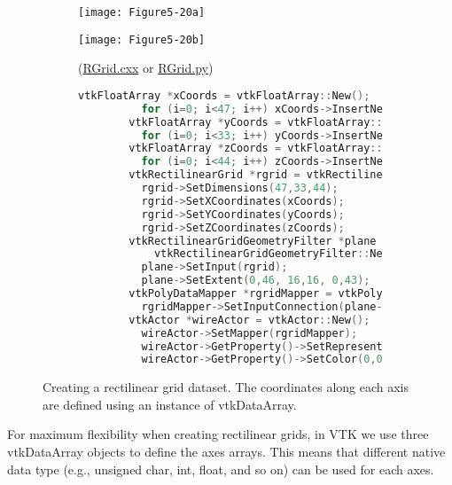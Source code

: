 \begin{figure}[!htb]
	\begin{subfigure}[h]{0.48\linewidth}
		\texttt{[image: Figure5-20a]}
		\caption*{}
		\label{fig:Figure5-20a}
	\end{subfigure}
	\hfill
	\begin{subfigure}[h]{0.48\linewidth}
		\texttt{[image: Figure5-20b]}
		\caption*{(\href{https://lorensen.github.io/VTKExamples/site/Cxx/RectilinearGrid/RGrid/}{RGrid.cxx} or \href{https://lorensen.github.io/VTKExamples/site/Python/RectilinearGrid/RGrid/}{RGrid.py})}
		\label{fig:Figure5-20b}
	\end{subfigure}
	\hfill
	\begin{subfigure}[h]{0.96\linewidth}
		\caption*{}
	\end{subfigure}
	\hfill
	\begin{subfigure}[h]{0.96\linewidth}
		\begin{lstlisting}[language=C++, caption={}]
		vtkFloatArray *xCoords = vtkFloatArray::New();
		  for (i=0; i<47; i++) xCoords->InsertNextValue(i,x[i]);
		vtkFloatArray *yCoords = vtkFloatArray::New();
		  for (i=0; i<33; i++) yCoords->InsertNextValue(i,y[i]);
		vtkFloatArray *zCoords = vtkFloatArray::New();
		  for (i=0; i<44; i++) zCoords->InsertNextValue(i,z[i]);
		vtkRectilinearGrid *rgrid = vtkRectilinearGrid::New();
		  rgrid->SetDimensions(47,33,44);
		  rgrid->SetXCoordinates(xCoords);
		  rgrid->SetYCoordinates(yCoords);
		  rgrid->SetZCoordinates(zCoords);
		vtkRectilinearGridGeometryFilter *plane =
		    vtkRectilinearGridGeometryFilter::New();
		  plane->SetInput(rgrid);
		  plane->SetExtent(0,46, 16,16, 0,43);
		vtkPolyDataMapper *rgridMapper = vtkPolyDataMapper::New();
		  rgridMapper->SetInputConnection(plane->GetOutputPort());
		vtkActor *wireActor = vtkActor::New();
		  wireActor->SetMapper(rgridMapper);
		  wireActor->GetProperty()->SetRepresentationToWireframe();
		  wireActor->GetProperty()->SetColor(0,0,0);
		\end{lstlisting}
		\caption*{}
		\label{fig:Figure5-20c}
	\end{subfigure}
	\caption{Creating a rectilinear grid dataset. The coordinates along each axis are defined using an instance of vtkDataArray.}\label{fig:Figure5-20}
\end{figure}

For maximum flexibility when creating rectilinear grids, in VTK we use three vtkDataArray objects to define the axes arrays. This means that different native data type (e.g., unsigned char, int, float, and so on) can be used for each axes.

